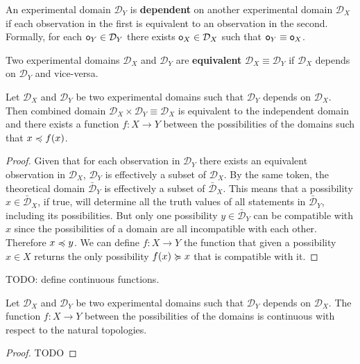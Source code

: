 \documentclass[11pt,letterpaper,fleqn]{memoir} %
\begin{document}
\begin{mathSection}
	\begin{defn}
		An experimental domain $\mathcal{D}_Y$ is \textbf{dependent} on another experimental domain $\mathcal{D}_X$ if each observation in the first is equivalent to an observation in the second. Formally, for each $\mathsf{o}_Y \in \mathcal{D}_Y$ there exists $\mathsf{o}_X \in \mathcal{D}_X$ such that $\mathsf{o}_Y\equiv \mathsf{o}_X$.
	\end{defn}
	\begin{defn}
		Two experimental domains $\mathcal{D}_X$ and $\mathcal{D}_Y$ are \textbf{equivalent} $\mathcal{D}_X \equiv \mathcal{D}_Y$ if $\mathcal{D}_X$ depends on $\mathcal{D}_Y$ and vice-versa.
	\end{defn}
	\begin{prop}
		Let $\mathcal{D}_X$ and $\mathcal{D}_Y$ be two experimental domains such that $\mathcal{D}_Y$ depends on $\mathcal{D}_X$. Then combined domain $\mathcal{D}_X \times \mathcal{D}_Y \equiv \mathcal{D}_X$ is equivalent to the independent domain and there exists a function $f : X \to Y$ between the possibilities of the domains such that $x \preccurlyeq f(x)$.
	\end{prop}
	\begin{proof}
		Given that for each observation in $\mathcal{D}_Y$ there exists an equivalent observation in $\mathcal{D}_X$, $\mathcal{D}_Y$ is effectively a subset of $\mathcal{D}_X$. By the same token, the theoretical domain $\bar{\mathcal{D}}_Y$ is effectively a subset of $\bar{\mathcal{D}}_X$. This means that a possibility $x \in \bar{\mathcal{D}}_X$, if true, will determine all the truth values of  all statements in $\bar{\mathcal{D}}_Y$, including its possibilities. But only one possibility $y \in \bar{\mathcal{D}}_Y$ can be compatible with $x$ since the possibilities of a domain are all incompatible with each other. Therefore $x \preccurlyeq y$. We can define $f : X \to Y$ the function that given a possibility $x \in X$ returns the only possibility $f(x) \succcurlyeq x$ that is compatible with it.
	\end{proof}
	\begin{defn}
		TODO: define continuous functions.
	\end{defn}
	\begin{prop}
		Let $\mathcal{D}_X$ and $\mathcal{D}_Y$ be two experimental domains such that $\mathcal{D}_Y$ depends on $\mathcal{D}_X$. The function $f : X \to Y$ between the possibilities of the domains is continuous with respect to the natural topologies.
	\end{prop}
	\begin{proof}
		TODO
	\end{proof}
\end{mathSection}
\end{document}

